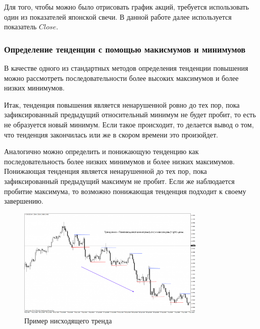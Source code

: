 \documentclass[bachelor, och, coursework]{SCWorks}
\begin{document}
            Для того, чтобы можно было отрисовать график акций, требуется
            использовать один из показателей японской свечи. В данной работе
            далее используется показатель $Close$.

            \subsubsection{Определение тенденции с помощью макисмумов и минимумов}

                В качестве одного из стандартных методов определения тенденции
                повышения можно рассмотреть последовательности более высоких
                максимумов и более низких минимумов.    

                Итак, тенденция повышения является ненарушенной ровно до тех
                пор, пока зафиксированный предыдущий относительный минимум не
                будет пробит, то есть не образуется новый минимум. Если такое
                происходит, то делается вывод о том, что тенденция закончилась
                или же в скором времени это произойдет.

                Аналогично можно определить и понижающую тенденцию как
                последовательность более низких минимумов и более низких
                максимумов. Понижающая тенденция является ненарушенной до тех
                пор, пока зафиксированный предыдущий максимум не пробит. Если же
                наблюдается пробитие максимума, то возможно понижающая тенденция
                подходит к своему завершению.

                \begin{figure}[H]
                    \centering
                    \includegraphics[width=0.8\textwidth]{pic/trand.png}
                    \caption{Пример нисходящего тренда}
                \end{figure}
\end{document}
